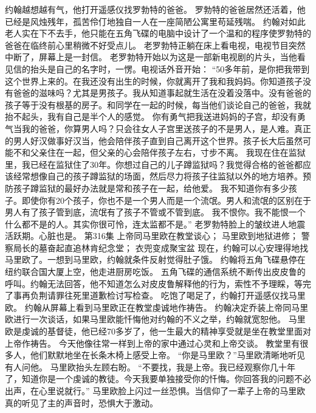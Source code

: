 \documentclass[a4paper,12pt,UTF8,twoside]{ctexbook}
\begin{document}
        约翰越想越有气，他打开遥感仪找罗勃特的爸爸。  
        罗勃特的爸爸居然还活着，他已经是风烛残年，孤苦伶仃地独自一人在一座简陋公寓里苟延残喘。  
        约翰对如此老人实在下不去手，他只能在五角飞碟的电脑中设计了一个温和的程序使罗勃特的爸爸在临终前心里稍微不好受点儿。  
        老罗勃特正躺在床上看电视，电视节目突然中断了，屏幕上是一封信。  
        老罗勃特开始以为这是一部新电视剧的片头，当他看见信的抬头是自己的名字时，一愣。电视话外音开始：  
        “50多年前，是你把我带到这个世界上来的。在我还没有出生的时候，你就离开了我和我妈妈。你知道孩子没有爸爸的滋味吗？尤其是男孩子。我从知道事起就生活在没着没落中。没有爸爸的孩子等于没有根基的房子。和同学在一起的时候，每当他们谈论自己的爸爸，我就抬不起头，我有自己是半个人的感觉。  
        你有勇气把我送进妈妈的子宫，却没有勇气当我的爸爸，你算男人吗？只会往女人子宫里送孩子的不是男人，是人难。真正的男人好汉做事好汉当，他会陪伴孩子直到自己离开这个世界。孩子长大后虽然可能不和父亲住在一起，但父亲的心会陪伴孩子左右，寸步不离。  
        我现在住在监狱里，我已经在监狱住了30年。你想过自己的儿子蹲监狱吗？我觉得合格的爸爸都应该经常想像自己的孩子蹲监狱的场面，然后尽力将孩子往监狱以外的地方培养。预防孩子蹲监狱的最好办法就是常和孩子在一起，给他爱。  
        我不知道你有多少孩子。即使你有20个孩子，你也不是一个男人而是一个流氓。男人和流氓的区别在于男人有了孩子管到底，流氓有了孩子不管或不管到底。  
        我不恨你。我不能恨一个什么都不是的人。其实你很可怜，连太监都不是。”  
        老罗勃特脸上的皱纹进人地震活跃期。心脏也是。          第316集  
        上帝同马里欧在教堂谈心；  
        马里欧到地狱进修；  
        警察局长的墓奋起直追林肯纪念堂；  
        衣兜变成聚宝盆    
        现在，约翰可以心安理得地找马里欧了。一想到马里欧，约翰就条件反射觉得肚子饿。  
        约翰将五角飞碟悬停在纽约联合国大厦上空，他走进厨房吃饭。  
        五角飞碟的通信系统不断传出皮皮鲁的呼叫。约翰无法回答，他不知道怎么对皮皮鲁解释他的行为，索性不予理睬，等完了事再负荆请罪往死里道歉检讨写检查。  
        吃饱了喝足了，约翰打开遥感仪找马里欧。  
        约翰从屏幕上看到马里欧正在教堂虔诚地作祷告。        
        约翰决定乔装上帝同马里欧进行一次谈话，如果马里欧能忏悔他对约翰的不义之举，约翰就宽恕他。  
        马里欧是虔诚的基督徒，他已经70多岁了，他一生最大的精神享受就是坐在教堂里面对上帝作祷告。  
        今天他像往常一样到上帝的家中通过心灵和上帝交谈。  
        教堂里有很多人，他们默默地坐在长条木椅上感受上帝。  
        “你是马里欧？”马里欧清晰地听见有人问他。  
        马里欧抬头左顾右盼。  
        “不要找，我是上帝。我已经观察你几十年了，知道你是一个虔诚的教徒。今天我要单独接受你的忏悔。你回答我的问题不必出声，在心里说就行。”  
        马里欧脸上闪过一丝恐惧。当信仰了一辈子上帝的马里欧真的听见了主的声音时，恐惧大于激动。  
\end{document}
